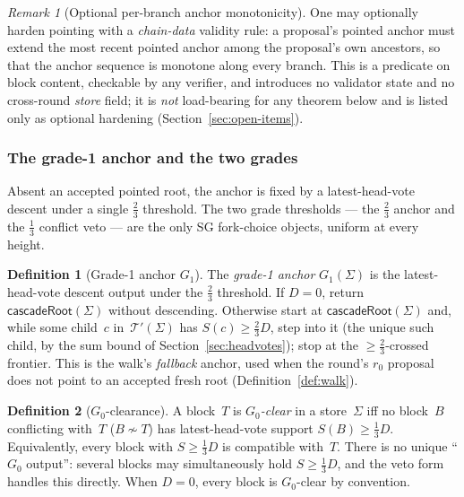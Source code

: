 \ifx\litemode\undefined\documentclass{article}\fi
\newcommand{\viableTree}{\ensuremath{\mathcal{T}'}}
\newcommand{\Supp}{\ensuremath{S}}          %
\newcommand{\Dvote}{\ensuremath{D}}         %
\newcommand{\Gzero}{\ensuremath{G_{0}}}
\newcommand{\Gone}{\ensuremath{G_{1}}}
\newcommand{\rzero}{\ensuremath{r_{0}}}                 %
\newcommand{\cascadeRoot}{\textsf{cascadeRoot}\xspace}
\theoremstyle{plain}
\theoremstyle{definition}
\newtheorem{definition}{Definition}
\theoremstyle{remark}
\newtheorem{remark}[theorem]{Remark}
\begin{document}
\begin{remark}[Optional per-branch anchor monotonicity]\label{rem:anchor-monotone}
One may optionally harden pointing with a \emph{chain-data} validity rule: a
proposal's pointed anchor must extend the most recent pointed anchor among the
proposal's own ancestors, so that the anchor sequence is monotone along every
branch.  This is a predicate on block content, checkable by any verifier, and
introduces no validator state and no cross-round \emph{store} field; it is
\emph{not} load-bearing for any theorem below and is listed only as optional
hardening (Section~\ref{sec:open-items}).
\end{remark}

\subsubsection*{The grade-1 anchor and the two grades}

Absent an accepted pointed root, the anchor is fixed by a latest-head-vote
descent under a single $\tfrac23$ threshold.  The two grade thresholds --- the
$\tfrac23$ anchor and the $\tfrac13$ conflict veto --- are the only SG
fork-choice objects, uniform at every height.

\begin{definition}[Grade-1 anchor $\Gone$]\label{def:g1}
The \emph{grade-1 anchor} $\Gone(\Sigma)$ is the latest-head-vote descent
output under the $\tfrac23$ threshold.  If $\Dvote=0$, return
$\cascadeRoot(\Sigma)$ without descending.  Otherwise start at
$\cascadeRoot(\Sigma)$ and, while some child~$c$
in~$\viableTree(\Sigma)$ has $\Supp(c) \geq \tfrac23\Dvote$, step into it (the
unique such child, by the sum bound of Section~\ref{sec:headvotes}); stop at the
$\geq\tfrac23$-crossed frontier.  This is the walk's \emph{fallback} anchor,
used when the round's $\rzero$ proposal does not point to an accepted fresh root
(Definition~\ref{def:walk}).
\end{definition}

\begin{definition}[$\Gzero$-clearance]\label{def:g0clear}
A block~$T$ is \emph{$\Gzero$-clear} in a store~$\Sigma$ iff no block~$B$
conflicting with~$T$ ($B \nsim T$) has latest-head-vote support
$\Supp(B) \geq \tfrac13\Dvote$.  Equivalently, every block with
$\Supp \geq \tfrac13\Dvote$ is compatible with~$T$.  There is no unique
``$\Gzero$ output'': several blocks may simultaneously hold
$\Supp \geq \tfrac13\Dvote$, and the veto form handles this directly.  When
$\Dvote=0$, every block is $\Gzero$-clear by convention.
\end{definition}
\end{document}
